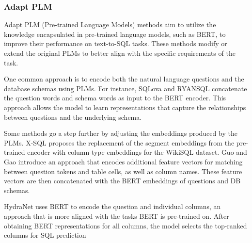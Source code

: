 \subsubsection{Adapt PLM} %
\label{sec:adaptplm}

Adapt PLM (Pre-trained Language Models) methods aim to utilize the knowledge encapsulated in pre-trained language models, such as BERT\cite{DBLP:journals/corr/abs-1810-04805}, to improve their performance on text-to-SQL tasks. These methods modify or extend the original PLMs to better align with the specific requirements of the task.

One common approach is to encode both the natural language questions and the database schemas using PLMs. For instance, SQLova\cite{DBLP:journals/corr/abs-1902-01069} and RYANSQL\cite{10.1162/coli_a_00403} concatenate the question words and schema words as input to the BERT encoder. This approach allows the model to learn representations that capture the relationships between questions and the underlying schema.

Some methods go a step further by adjusting the embeddings produced by the PLMs. X-SQL\cite{he2019xsql} proposes the replacement of the segment embeddings from the pre-trained encoder with column-type embeddings for the WikiSQL dataset. Guo and Gao \cite{guo2020content} introduce an approach that encodes additional feature vectors for matching between question tokens and table cells, as well as column names. These feature vectors are then concatenated with the BERT embeddings of questions and DB schemas.

HydraNet\cite{lyu_hybrid_2020} uses BERT to encode the question and individual columns, an approach that is more aligned with the tasks BERT is pre-trained on. After obtaining BERT representations for all columns, the model selects the top-ranked columns for SQL prediction


\begin{table}[t]
    \centering
    \caption{The execution accuracy on the WikiSQL dev set.}
    \label{table:methods:encoders:adaptplm}
\end{table}

